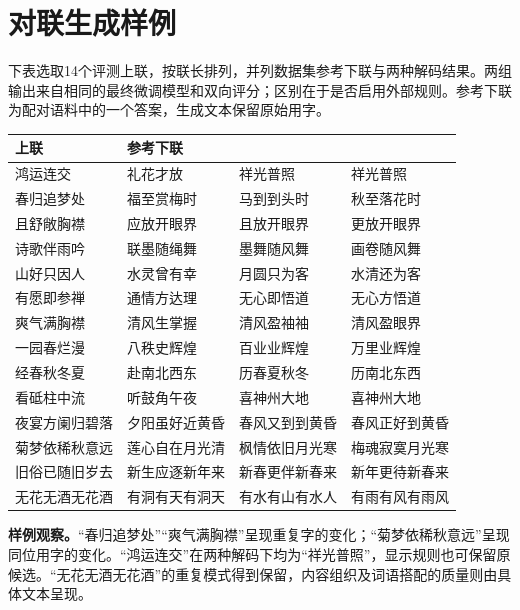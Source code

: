 \section{对联生成样例}\label{app:couplets}

下表选取14个评测上联，按联长排列，并列数据集参考下联与两种解码结果。两组输出来自相同的最终微调模型和双向评分；区别在于是否启用外部规则。参考下联为配对语料中的一个答案，生成文本保留原始用字。

\begingroup
\small\setlength{\tabcolsep}{4pt}\renewcommand{\arraystretch}{1.1}
\noindent\begin{tabularx}{\linewidth}{@{}C{3.65cm}C{3.65cm}YY@{}}
\toprule
\textbf{上联}&\textbf{参考下联}&\centering\arraybackslash{}&\centering\arraybackslash{}\\
\midrule
\rule{0pt}{9.4mm}鸿运连交&礼花才放&祥光普照&祥光普照\\
\rule{0pt}{9.4mm}春归追梦处&福至赏梅时&马到到头时&秋至落花时\\
\rule{0pt}{9.4mm}且舒敞胸襟&应放开眼界&且放开眼界&更放开眼界\\
\rule{0pt}{9.4mm}诗歌伴雨吟&联墨随绳舞&墨舞随风舞&画卷随风舞\\
\rule{0pt}{9.4mm}山好只因人&水灵曾有幸&月圆只为客&水清还为客\\
\rule{0pt}{9.4mm}有愿即参禅&通情方达理&无心即悟道&无心方悟道\\
\rule{0pt}{9.4mm}爽气满胸襟&清风生掌握&清风盈袖袖&清风盈眼界\\
\rule{0pt}{9.4mm}一园春烂漫&八秩史辉煌&百业业辉煌&万里业辉煌\\
\rule{0pt}{9.4mm}经春秋冬夏&赴南北西东&历春夏秋冬&历南北东西\\
\rule{0pt}{9.4mm}看砥柱中流&听鼓角午夜&喜神州大地&喜神州大地\\
\rule{0pt}{9.4mm}夜宴方阑归碧落&夕阳虽好近黄昏&春风又到到黄昏&春风正好到黄昏\\
\rule{0pt}{9.4mm}菊梦依稀秋意远&莲心自在月光清&枫情依旧月光寒&梅魂寂寞月光寒\\
\rule{0pt}{9.4mm}旧俗已随旧岁去&新生应逐新年来&新春更伴新春来&新年更待新春来\\
\rule{0pt}{9.4mm}无花无酒无花酒&有洞有天有洞天&有水有山有水人&有雨有风有雨风\\
\bottomrule
\end{tabularx}\par
\endgroup

\vspace{9pt}
\noindent\textbf{样例观察。}“春归追梦处”“爽气满胸襟”呈现重复字的变化；“菊梦依稀秋意远”呈现同位用字的变化。“鸿运连交”在两种解码下均为“祥光普照”，显示规则也可保留原候选。“无花无酒无花酒”的重复模式得到保留，内容组织及词语搭配的质量则由具体文本呈现。
